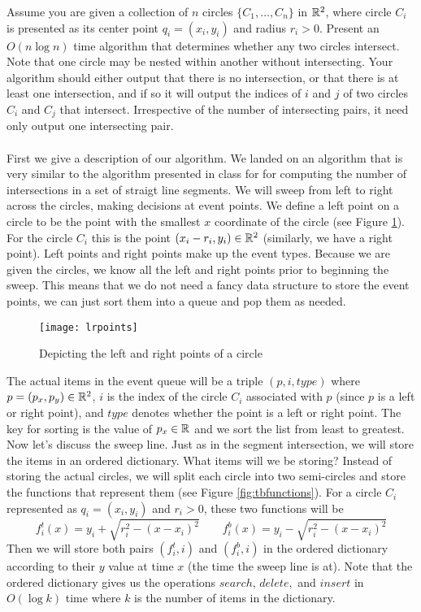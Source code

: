 \documentclass[11pt]{article}
\begin{document}
Assume you are given a collection of $n$ circles $\{C_1 , \ldots , C_n \}$ in
$\mathbb{R}^2$, where circle $C_i$ is presented as its center point $q_i = (x_i, y_i)$
and radius $r_i > 0$. Present an $O(n \log n)$ time algorithm that determines
whether any two circles intersect. Note that one circle may be nested within
another without intersecting. Your algorithm should either output
that there is no intersection, or that there is at least one intersection, and
if so it will output the indices of $i$ and $j$ of two circles $C_i$ and $C_j$
that intersect. Irrespective of the number of intersecting pairs, it need only
output one intersecting pair. \\\\
\answer
First we give a description of our algorithm.
We landed on an algorithm that is very similar to the algorithm presented in class for for computing the number of intersections in a set of straigt line segments.
We will sweep from left to right across the circles, making decisions at event points.
We define a left point on a circle to be the point with the smallest $x$ coordinate of the circle (see Figure \ref{fig:lrpoints}).
For the circle $C_i$ this is the point $(x_i - r_i, y_i) \in \mathbb{R} ^2$ (similarly, we have a right point).
Left points and right points make up the event types.
Because we are given the circles, we know all the left and right points prior to beginning the sweep.
This means that we do not need a fancy data structure to store the event points, we can just sort them into a queue and pop them as needed.

\begin{figure}[h]
   \centering
   \texttt{[image: lrpoints]}
   \caption{Depicting the left and right points of a circle}
   \label{fig:lrpoints}
\end{figure}

The actual items in the event queue will be a triple $(p, i, type)$ where $p = (p_x, p_y) \in \mathbb{R} ^2$, $i$ is the index of the circle $C_i$ associated with $p$ (since $p$ is a left or right point), and $type$ denotes whether the point is a left or right point.
The key for sorting is the value of $p_x \in \mathbb{R}$ and we sort the list from least to greatest.
Now let's discuss the sweep line.
Just as in the segment intersection, we will store the items in an ordered dictionary.
What items will we be storing?
Instead of storing the actual circles, we will split each circle into two semi-circles and store the functions that represent them (see Figure \ref{fig:tbfunctions}).
For a circle $C_i$ represented as $q_i = (x_i, y_i)$ and $r_i > 0$, these two functions will be
$$ f_i^t (x) = y_i + \sqrt{r_i^2 - (x - x_i)^2} \hspace{2em} f_i^b (x) = y_i - \sqrt{r_i^2 - (x - x_i)^2} $$
Then we will store both pairs $(f_i^t, i)$ and $(f_i^b, i)$ in the ordered dictionary according to their $y$ value at time $x$ (the time the sweep line is at).
Note that the ordered dictionary gives us the operations $search,\, delete,$ and $insert$ in $O(\log k)$ time where $k$ is the number of items in the dictionary.
\end{document}
